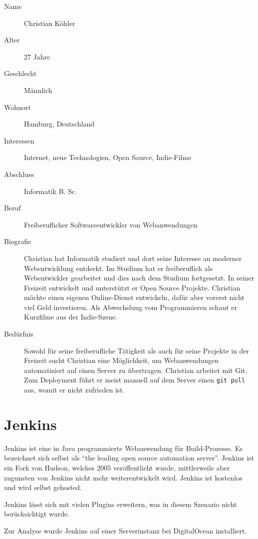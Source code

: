 \begin{description}
  \item [Name] Christian Köhler
  \item [Alter] 27 Jahre
  \item [Geschlecht] Männlich
  \item [Wohnort] Hamburg, Deutschland
  \item [Interessen] Internet, neue Technologien, Open Source, Indie-Filme
  \item [Abschluss] Informatik B. Sc.
  \item [Beruf] Freiberuflicher Softwareentwickler von Webanwendungen
  \item [Biografie] Christian hat Informatik studiert und dort seine Interesse an moderner Webentwicklung entdeckt. Im Studium hat er freiberuflich als Webentwickler gearbeitet und dies nach dem Studium fortgesetzt. In seiner Freizeit entwickelt und unterstützt er Open Source Projekte. Christian möchte einen eigenen Online-Dienst entwickeln, dafür aber vorerst nicht viel Geld investieren. Als Abwechslung vom Programmieren schaut er Kurzfilme aus der Indie-Szene.
  \item [Bedürfnis] Sowohl für seine freiberufliche Tätigkeit als auch für seine Projekte in der Freizeit sucht Christian eine Möglichkeit, um Webanwendungen automatisiert auf einen Server zu übertragen. Christian arbeitet mit Git. Zum Deployment führt er meist manuell auf dem Server einen \texttt{git pull} aus, womit er nicht zufrieden ist.
\end{description}

\section{Jenkins}
\label{sec:analyse-jenkins}

Jenkins ist eine in Java programmierte Webanwendung für Build-Prozesse. Es bezeichnet sich selbst als ``the leading open source automation server''. Jenkins ist ein Fork von Hudson, welches 2005 veröffentlicht wurde, mittlerweile aber zugunsten von Jenkins nicht mehr weiterentwickelt wird. Jenkins ist kostenlos und wird selbst gehosted.

Jenkins lässt sich mit vielen Plugins erweitern, was in diesem Szenario nicht berücksichtigt wurde.

Zur Analyse wurde Jenkins auf einer Serverinstanz bei DigitalOcean installiert.

